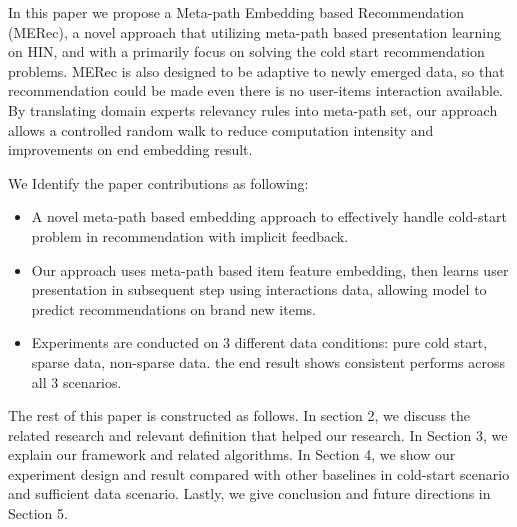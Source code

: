 In this paper we propose a Meta-path Embedding based Recommendation (MERec), a novel approach that utilizing meta-path based presentation learning on HIN, and with a primarily focus on solving the cold start recommendation problems. MERec is also designed to be adaptive to newly emerged data, so that recommendation could be made even there is no user-items interaction available. By translating domain experts relevancy rules into meta-path set, our approach allows a controlled random walk to reduce computation intensity and improvements on end embedding result. 

We Identify the paper contributions as following:
\begin{itemize}
    \item A novel meta-path based embedding approach to effectively handle cold-start problem in  recommendation with implicit feedback.
    \item Our approach uses meta-path based item feature embedding, then learns user presentation in subsequent step using interactions data, allowing model to predict recommendations on brand new items. 
    \item Experiments are conducted on 3 different data conditions: pure cold start, sparse data, non-sparse data. the end result shows consistent performs across all 3 scenarios.
\end{itemize}

The rest of this paper is constructed as follows. In section 2, we discuss the related research and relevant definition that helped our research. In Section 3, we explain our framework and related algorithms. In Section 4, we show our experiment design and result compared with other baselines in cold-start scenario and sufficient data scenario. Lastly, we give conclusion and future directions in Section 5.